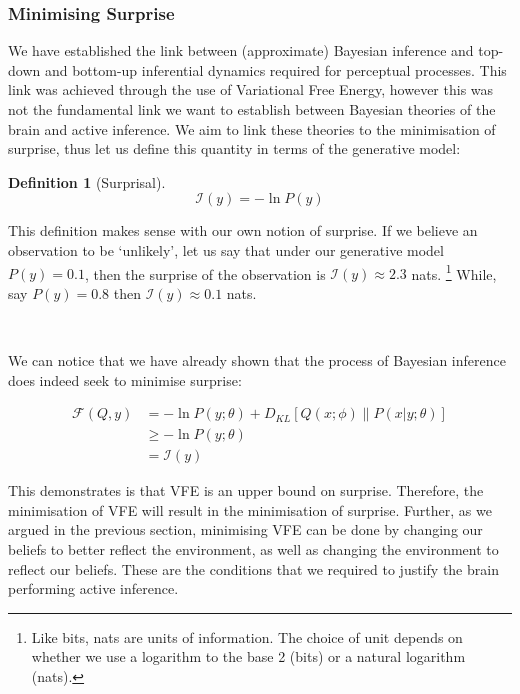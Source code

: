 \documentclass{article}
\newtheorem{definition}{Definition}
\begin{document}
\subsubsection{Minimising Surprise}

We have established the link between (approximate) Bayesian inference and top-down and bottom-up inferential dynamics required for perceptual processes. This link was achieved through the use of Variational Free Energy, however this was not the fundamental link we want to establish between Bayesian theories of the brain and active inference. We aim to link these theories to the minimisation of surprise, thus let us define this quantity in terms of the generative model:

\begin{definition}[Surprisal]\label{eq:surprisal}
	$$\mathcal{I}(y) = - \ln P(y)$$
\end{definition}

This definition makes sense with our own notion of surprise. If we believe an observation to be `unlikely', let us say that under our generative model $P(y) = 0.1$, then the surprise of the observation is $ \mathcal{I}(y) \approx 2.3$ nats. \footnote{Like bits, nats are units of information. The choice of unit depends on whether we use a logarithm to the base 2 (bits) or a natural logarithm (nats).} While, say $P(y) = 0.8$ then $\mathcal{I}(y) \approx 0.1$ nats. 

\

We can notice that we have already shown that the process of Bayesian inference does indeed seek to minimise surprise:

\begin{equation}
	\begin{aligned}
		\mathcal{F}(Q, y) &= - \ln P(y; \theta) + D_{KL}\left[ Q(x; \phi) \| P(x | y; \theta) \right] \\
		&\geq - \ln P(y; \theta) \\
		&= \mathcal{I}(y)
	\end{aligned}
\end{equation}

This demonstrates is that VFE is an upper bound on surprise. Therefore, the minimisation of VFE will result in the minimisation of surprise. Further, as we argued in the previous section, minimising VFE can be done by changing our beliefs to better reflect the environment, as well as changing the environment to reflect our beliefs. These are the conditions that we required to justify the brain performing active inference. 
\end{document}

